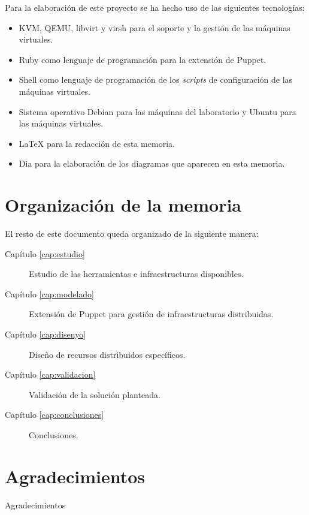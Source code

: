 Para la elaboración de este proyecto se ha hecho uso de las siguientes tecnologías:
\begin{itemize}
\item KVM, QEMU, libvirt y virsh para el soporte y la gestión de las máquinas virtuales.
\item Ruby como lenguaje de programación para la extensión de Puppet.
\item Shell como lenguaje de programación de los \emph{scripts} de configuración de las máquinas virtuales.
\item Sistema operativo Debian para las máquinas del laboratorio y Ubuntu para las máquinas virtuales.
\item \LaTeX{} \cite{manual:latex} para la redacción de esta memoria.
\item Dia para la elaboración de los diagramas que aparecen en esta memoria.
\end{itemize}


\section{Organización de la memoria}

El resto de este documento queda organizado de la siguiente manera:
\begin{description}
\item[Capítulo \ref{cap:estudio}] Estudio de las herramientas e infraestructuras disponibles.
\item[Capítulo \ref{cap:modelado}] Extensión de Puppet para gestión de infraestructuras distribuidas.
\item[Capítulo \ref{cap:disenyo}] Diseño de recursos distribuidos específicos.
\item[Capítulo \ref{cap:validacion}] Validación de la solución planteada.
\item[Capítulo \ref{cap:conclusiones}] Conclusiones.
\end{description}


\section{Agradecimientos}

Agradecimientos
